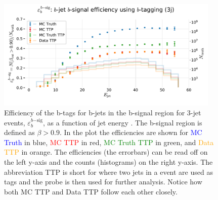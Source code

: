 \begin{figure}
  \includegraphics[width=0.95\textwidth, trim=0 0 0 40, clip]{figures/quarks/eff_b_bsig-down_sample=1.00-ML_vars=vertex-selection=b-ejet_min=4-n_iter_RS_lgb=99-n_iter_RS_xgb=9-cdot_cut=0.90-version=19.pdf}
  \caption[b-Tagging Efficiency $\varepsilon_b^{b\mathrm{-sig}}$ as a function of jet energy]
          {Efficiency of the b-tags for b-jets in the b-signal region for 3-jet events, $\varepsilon_b^{b\mathrm{-sig}}$, as a function of jet energy . The b-signal region is defined as $\beta > 0.9$. In the plot the efficiencies are shown for \textcolor{blue}{MC Truth} in blue, \textcolor{red}{MC TTP} in red, \textcolor{green}{MC Truth TTP} in green, and \textcolor{orange}{Data TTP} in orange. The efficiencies (the errorbars) can be read off on the left y-axis and the counts (histograms) on the right y-axis. The abbreviation TTP is short for  where two jets in a event are used as tags and the probe is then used for further analysis. Notice how both MC TTP and Data TTP follow each other closely.  
          } 
  \label{fig:q:effiency_btag_bjet_bsig}
\end{figure}


